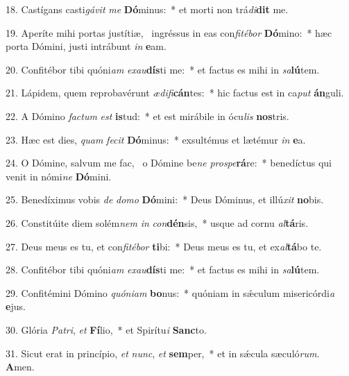 18. Castígans casti\textit{gá}\textit{vit} \textit{me} \textbf{Dó}minus:~*  et morti non trá\textit{di}\textbf{dit} me.\

19. Aperíte mihi portas justítiæ, \dag\  ingréssus in eas con\textit{fi}\textit{té}\textit{bor} \textbf{Dó}mino:~*  hæc porta Dómini, justi intrábunt \textit{in} \textbf{e}am.\

20. Confitébor tibi quóni\textit{am} \textit{ex}\textit{au}\textbf{dís}ti me:~*  et factus es mihi in \textit{sa}\textbf{lú}tem.\

21. Lápidem, quem reprobavérunt \textit{æ}\textit{di}\textit{fi}\textbf{cán}tes:~*  hic factus est in ca\textit{put} \textbf{án}guli.\

22. A Dómino \textit{fac}\textit{tum} \textit{est} \textbf{is}tud:~*  et est mirábile in ócu\textit{lis} \textbf{nos}tris.\

23. Hæc est dies, \textit{quam} \textit{fe}\textit{cit} \textbf{Dó}minus:~*  exsultémus et lætémur \textit{in} \textbf{e}a.\

24. O Dómine, salvum me fac, \dag\  o Dómine be\textit{ne} \textit{pro}\textit{spe}\textbf{rá}re:~*  benedíctus qui venit in nómi\textit{ne} \textbf{Dó}mini.\

25. Benedíximus vobis \textit{de} \textit{do}\textit{mo} \textbf{Dó}mini:~*  Deus Dóminus, et illú\textit{xit} \textbf{no}bis.\

26. Constitúite diem solém\textit{nem} \textit{in} \textit{con}\textbf{dén}sis,~*  usque ad cornu \textit{al}\textbf{tá}ris.\

27. Deus meus es tu, et con\textit{fi}\textit{té}\textit{bor} \textbf{ti}bi:~*  Deus meus es tu, et ex\textit{al}\textbf{tá}bo te.\

28. Confitébor tibi quóni\textit{am} \textit{ex}\textit{au}\textbf{dís}ti me:~*  et factus es mihi in \textit{sa}\textbf{lú}tem.\

29. Confitémini Dómino \textit{quón}\textit{i}\textit{am} \textbf{bo}nus:~*  quóniam in sǽculum misericórdi\textit{a} \textbf{e}jus.\

30. Glória \textit{Pa}\textit{tri}, \textit{et} \textbf{Fí}lio,~*  et Spirítu\textit{i} \textbf{Sanc}to.\

31. Sicut erat in princípio, \textit{et} \textit{nunc}, \textit{et} \textbf{sem}per,~*  et in sǽcula sæculó\textit{rum}. \textbf{A}men.\

